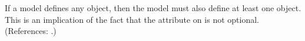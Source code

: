 If a model defines any \Species object, then the model must also define at
least one \Compartment object.  This is an implication of the fact that the
 attribute on \Species is not optional.  (References:
.)
